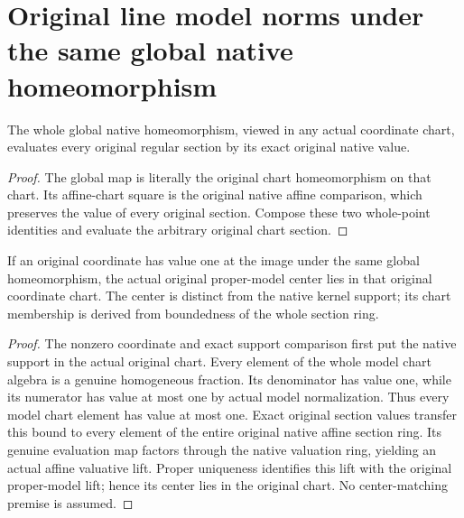 \section{Original line model norms under the same global native homeomorphism}
\label{sec:projective-native-model-line-metrics}

\begin{theorem}
\label{thm:projective-native-model-global-section-values}
\leanok
{}
The whole global native homeomorphism, viewed in any actual coordinate chart,
evaluates every original regular section by its exact original native value.
\end{theorem}
\begin{proof}
The global map is literally the original chart homeomorphism on that chart.
Its affine-chart square is the original native affine comparison, which
preserves the value of every original section. Compose these two whole-point
identities and evaluate the arbitrary original chart section.
\end{proof}

\begin{theorem}
\label{thm:projective-native-model-value-one-center}
\leanok
{}
If an original coordinate has value one at the image under the same global
homeomorphism, the actual original proper-model center lies in that original
coordinate chart. The center is distinct from the native kernel support;
its chart membership is derived from boundedness of the whole section ring.
\end{theorem}
\begin{proof}
The nonzero coordinate and exact support comparison first put the native
support in the actual original chart. Every element of the whole model chart
algebra is a genuine homogeneous fraction. Its denominator has value one,
while its numerator has value at most one by actual model normalization.
Thus every model chart element has value at most one. Exact original section
values transfer this bound to every element of the entire original native
affine section ring. Its genuine evaluation map factors through the native
valuation ring, yielding an actual affine valuative lift. Proper uniqueness
identifies this lift with the original proper-model lift; hence its center
lies in the original chart. No center-matching premise is assumed.
\end{proof}

